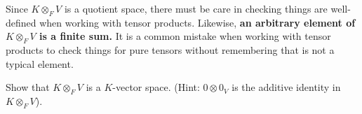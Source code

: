     \begin{note}
        Since $K \otimes_F V$ is a quotient space, there must be care in checking things are well-defined when working with tensor products. Likewise, \textbf{an arbitrary element of $K \otimes_F V$ is a finite sum.} It is a common mistake when working with tensor products to check things for pure tensors without remembering that is not a typical element.
    \end{note}

    \begin{exercise}
        Show that $K \otimes_F V$ is a $K$-vector space. (Hint: $0 \otimes 0_V$ is the additive identity in $K \otimes_F V$).
    \end{exercise}